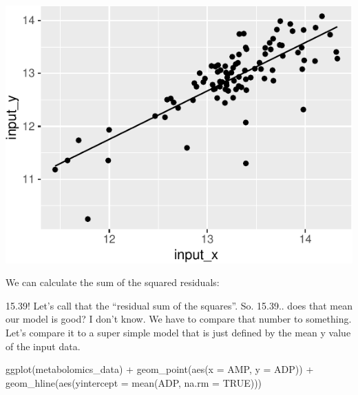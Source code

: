 \documentclass[
]{krantz}
\newenvironment{Shaded}{\begin{snugshade}}{\end{snugshade}}
\newcommand{\AttributeTok}[1]{\textcolor[rgb]{0.77,0.63,0.00}{#1}}
\newcommand{\ConstantTok}[1]{\textcolor[rgb]{0.00,0.00,0.00}{#1}}
\newcommand{\DecValTok}[1]{\textcolor[rgb]{0.00,0.00,0.81}{#1}}
\newcommand{\DocumentationTok}[1]{\textcolor[rgb]{0.56,0.35,0.01}{\textbf{\textit{#1}}}}
\newcommand{\FunctionTok}[1]{\textcolor[rgb]{0.00,0.00,0.00}{#1}}
\newcommand{\NormalTok}[1]{#1}
\newcommand{\SpecialCharTok}[1]{\textcolor[rgb]{0.00,0.00,0.00}{#1}}
\begin{document}
\begin{center}\includegraphics{index_files/figure-latex/unnamed-chunk-123-1} \end{center}

We can calculate the sum of the squared residuals:

\begin{Shaded}
\end{Shaded}

15.39! Let's call that the ``residual sum of the squares''. So. 15.39.. does that mean our model is good? I don't know. We have to compare that number to something. Let's compare it to a super simple model that is just defined by the mean y value of the input data.

\begin{Shaded}
\begin{Highlighting}[]
\FunctionTok{ggplot}\NormalTok{(metabolomics\_data) }\SpecialCharTok{+}
  \FunctionTok{geom\_point}\NormalTok{(}\FunctionTok{aes}\NormalTok{(}\AttributeTok{x =}\NormalTok{ AMP, }\AttributeTok{y =}\NormalTok{ ADP)) }\SpecialCharTok{+}
  \FunctionTok{geom\_hline}\NormalTok{(}\FunctionTok{aes}\NormalTok{(}\AttributeTok{yintercept =} \FunctionTok{mean}\NormalTok{(ADP, }\AttributeTok{na.rm =} \ConstantTok{TRUE}\NormalTok{)))}
\end{Highlighting}
\end{Shaded}
\end{document}
